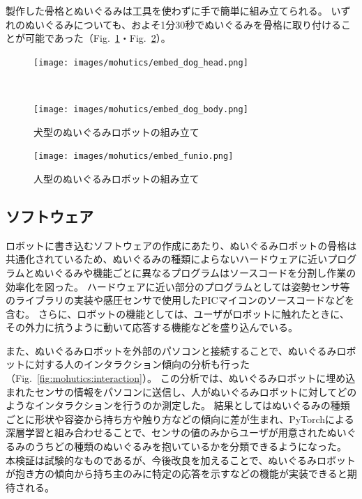 \documentclass[uplatex,a4paper,12pt]{jsarticle}
\renewcommand{\figurename}{Fig.}
\newcommand{\figref}[1]{\figurename~\ref{#1}}
\begin{document}
製作した骨格とぬいぐるみは工具を使わずに手で簡単に組み立てられる。
いずれのぬいぐるみについても、およそ1分30秒でぬいぐるみを骨格に取り付けることが可能であった（\figref{fig:mohutics:embed_dog}・\figref{fig:mohutics:embed_funio}）。

\begin{figure}[htbp]
  \centering
  \begin{minipage}[c]{\linewidth}
    \centering
    \texttt{[image: images/mohutics/embed\_dog\_head.png]}
  \end{minipage} \\
  \begin{minipage}[c]{\linewidth}
    \centering
    \texttt{[image: images/mohutics/embed\_dog\_body.png]}
  \end{minipage}
  \caption{犬型のぬいぐるみロボットの組み立て}
  \label{fig:mohutics:embed_dog}
\end{figure}

\begin{figure}[htbp]
  \centering
  \texttt{[image: images/mohutics/embed\_funio.png]}
  \caption{人型のぬいぐるみロボットの組み立て}
  \label{fig:mohutics:embed_funio}
\end{figure}

\subsection{ソフトウェア}
ロボットに書き込むソフトウェアの作成にあたり、ぬいぐるみロボットの骨格は共通化されているため、ぬいぐるみの種類によらないハードウェアに近いプログラムとぬいぐるみや機能ごとに異なるプログラムはソースコードを分割し作業の効率化を図った。
ハードウェアに近い部分のプログラムとしては姿勢センサ等のライブラリの実装や感圧センサで使用したPICマイコンのソースコードなどを含む。
さらに、ロボットの機能としては、ユーザがロボットに触れたときに、その外力に抗うように動いて応答する機能などを盛り込んでいる。

また、ぬいぐるみロボットを外部のパソコンと接続することで、ぬいぐるみロボットに対する人のインタラクション傾向の分析も行った（\figref{fig:mohutics:interaction}）。
この分析では、ぬいぐるみロボットに埋め込まれたセンサの情報をパソコンに送信し、人がぬいぐるみロボットに対してどのようなインタラクションを行うのか測定した。
結果としてはぬいぐるみの種類ごとに形状や容姿から持ち方や触り方などの傾向に差が生まれ、PyTorchによる深層学習と組み合わせることで、センサの値のみからユーザが用意されたぬいぐるみのうちどの種類のぬいぐるみを抱いているかを分類できるようになった。
本検証は試験的なものであるが、今後改良を加えることで、ぬいぐるみロボットが抱き方の傾向から持ち主のみに特定の応答を示すなどの機能が実装できると期待される。
\end{document}
